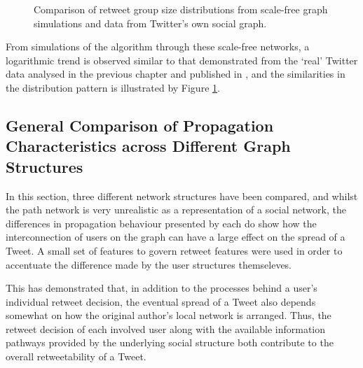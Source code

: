\begin{figure}[h]
\centering
{}
\caption{Comparison of retweet group size distributions from scale-free graph simulations and data from Twitter's own social graph.}
\label{fig:real-scalefree}
\end{figure}

From simulations of the algorithm through these scale-free networks, a logarithmic trend is observed similar to that demonstrated from the `real' Twitter data analysed in the previous chapter and published in \cite{webberley11}, and the similarities in the distribution pattern is illustrated by Figure \ref{fig:real-scalefree}.


\subsection{General Comparison of Propagation Characteristics across Different Graph Structures}
In this section, three different network structures have been compared, and whilst the path network is very unrealistic as a representation of a social network, the differences in propagation behaviour presented by each do show how the interconnection of users on the graph can have a large effect on the spread of a Tweet. A small set of features to govern retweet features were used in order to accentuate the difference made by the user structures themseleves.

This has demonstrated that, in addition to the processes behind a user's individual retweet decision, the eventual spread of a Tweet also depends somewhat on how the original author's local network is arranged. Thus, the retweet decision of each involved user along with the available information pathways provided by the underlying social structure both contribute to the overall retweetability of a Tweet. 

